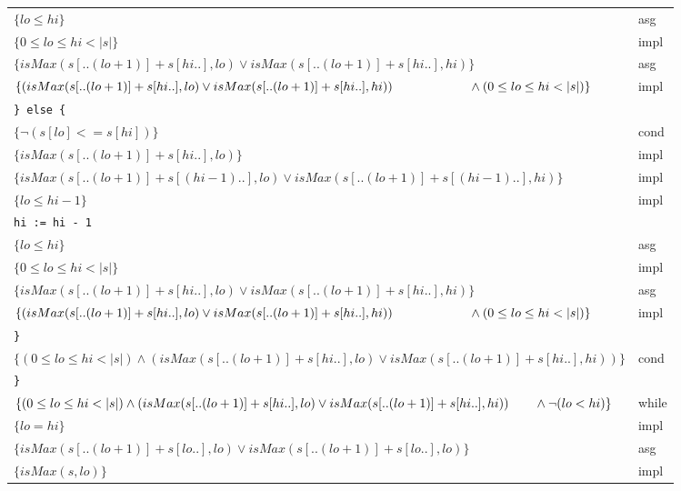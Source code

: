 \documentclass[12pt]{article}
\begin{document}
\begin{center}
\begin{tabular}{ll}
        \qquad \qquad $\{ lo \le hi \}$ & asg \\
        \qquad \qquad $\{ 0 \le lo \le hi < |s| \}$ & impl \\
        \qquad \qquad $\{ isMax(s[..(lo + 1)] + s[hi..], lo) \vee isMax(s[..(lo + 1)] + s[hi..], hi) \}$ & asg \\
        \qquad \qquad $\{ (isMax(s[..(lo+1)] + s[hi..], lo) \vee isMax(s[..(lo+1)] + s[hi..], hi)) \\
            \qquad \qquad \qquad \wedge (0 \le lo \le hi < |s|) \}$ & impl \\
        {\color{gray} \qquad \texttt{\} else \{}} & \\
        \qquad \qquad $\{ \neg (s[lo] <= s[hi]) \}$ & cond \\
        \qquad \qquad $\{ isMax(s[..(lo + 1)] + s[hi..], lo) \}$ & impl \\
        \qquad \qquad $\{ isMax(s[..(lo + 1)] + s[(hi - 1)..], lo) \vee isMax(s[..(lo + 1)] + s[(hi - 1)..], hi) \}$ & impl \\
        \qquad \qquad $\{ lo \le hi - 1 \}$ & impl \\
        {\color{gray} \qquad \qquad \texttt{hi := hi - 1}} & \\
        \qquad \qquad $\{ lo \le hi \}$ & asg \\
        \qquad \qquad $\{ 0 \le lo \le hi < |s| \}$ & impl \\
        \qquad \qquad $\{ isMax(s[..(lo + 1)] + s[hi..], lo) \vee isMax(s[..(lo + 1)] + s[hi..], hi) \}$ & asg \\
        \qquad \qquad $\{ (isMax(s[..(lo+1)] + s[hi..], lo) \vee isMax(s[..(lo+1)] + s[hi..], hi)) \\
            \qquad \qquad \qquad \wedge (0 \le lo \le hi < |s|) \}$ & impl \\
        {\color{gray} \qquad \texttt{\}}} & \\
        \qquad $\{ (0 \le lo \le hi < |s|) \wedge (isMax(s[..(lo+1)] + s[hi..], lo) \vee isMax(s[..(lo+1)] + s[hi..], hi)) \}$ & cond \\
        {\color{gray} \texttt{\}}} & \\
        $\{ (0 \le lo \le hi < |s|) \wedge (isMax(s[..(lo+1)] + s[hi..], lo) \vee isMax(s[..(lo+1)] + s[hi..], hi)) \\
            \qquad \wedge \neg(lo < hi) \}$ & while \\
        $\{ lo = hi \}$ & impl \\
        $\{ isMax(s[..(lo+1)] + s[lo..], lo) \vee isMax(s[..(lo+1)] + s[lo..], lo) \}$ & asg \\
        $\{ isMax(s, lo) \}$ & impl
    \end{tabular}
\end{center}
\end{document}

